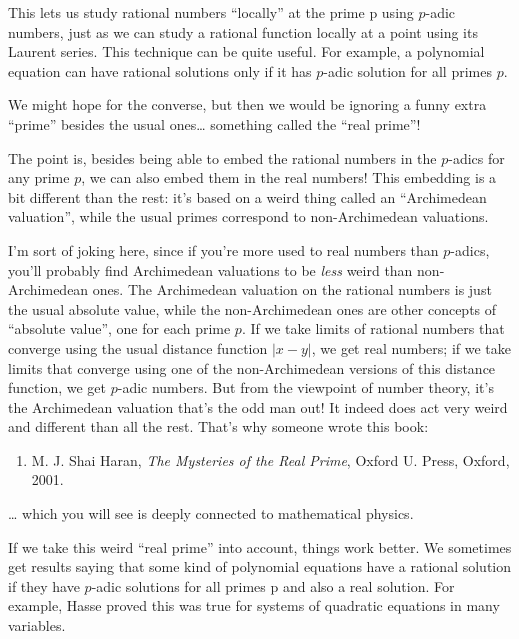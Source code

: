 \documentclass{article}
\def\tightlist{}
\begin{document}
This lets us study rational numbers ``locally'' at the prime p using
\(p\)-adic numbers, just as we can study a rational function locally at
a point using its Laurent series. This technique can be quite useful.
For example, a polynomial equation can have rational solutions only if
it has \(p\)-adic solution for all primes \(p\).

We might hope for the converse, but then we would be ignoring a funny
extra ``prime'' besides the usual ones\ldots{} something called the
``real prime''!

The point is, besides being able to embed the rational numbers in the
\(p\)-adics for any prime \(p\), we can also embed them in the real
numbers! This embedding is a bit different than the rest: it's based on
a weird thing called an ``Archimedean valuation'', while the usual
primes correspond to non-Archimedean valuations.

I'm sort of joking here, since if you're more used to real numbers than
\(p\)-adics, you'll probably find Archimedean valuations to be
\emph{less} weird than non-Archimedean ones. The Archimedean valuation
on the rational numbers is just the usual absolute value, while the
non-Archimedean ones are other concepts of ``absolute value'', one for
each prime \(p\). If we take limits of rational numbers that converge
using the usual distance function \(|x-y|\), we get real numbers; if we
take limits that converge using one of the non-Archimedean versions of
this distance function, we get \(p\)-adic numbers. But from the
viewpoint of number theory, it's the Archimedean valuation that's the
odd man out! It indeed does act very weird and different than all the
rest. That's why someone wrote this book:

\begin{enumerate}
\def\labelenumi{\arabic{enumi})}
\setcounter{enumi}{2}
\tightlist
\item
  M. J. Shai Haran, \emph{The Mysteries of the Real Prime}, Oxford U.
  Press, Oxford, 2001.
\end{enumerate}

\ldots{} which you will see is deeply connected to mathematical physics.

If we take this weird ``real prime'' into account, things work better.
We sometimes get results saying that some kind of polynomial equations
have a rational solution if they have \(p\)-adic solutions for all
primes p and also a real solution. For example, Hasse proved this was
true for systems of quadratic equations in many variables.
\end{document}
